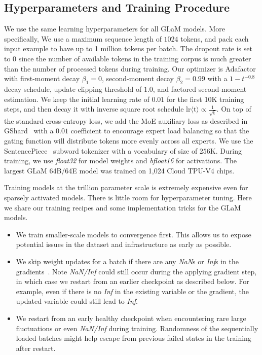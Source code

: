 \subsection{Hyperparameters and Training Procedure} We use the same learning hyperparameters for all GLaM models. More specifically, We use a maximum sequence length of $1024$ tokens, and pack each input example to have up to 1 million tokens per batch. The dropout rate is set to $0$ since the number of available tokens in the training corpus is much greater than the number of processed tokens during training. Our optimizer is Adafactor~\cite{Shazeer2018AdafactorAL} with first-moment decay $\beta_1=0$, second-moment decay $\beta_2=0.99$ with a $1 - t^{-0.8}$ decay schedule, update clipping threshold of $1.0$, and factored second-moment estimation. We keep the initial learning rate of $0.01$ for the first 10K training steps, and then decay it with inverse square root schedule $\text{lr} \langle \text{t} \rangle \propto \frac{1}{\sqrt{\text{t}}}$. On top of the standard cross-entropy loss, we add the MoE auxiliary loss as described in GShard~\cite{lepikhin2020gshard} with a $0.01$ coefficient to encourage expert load balancing so that the gating function will distribute tokens more evenly across all experts.  We use the SentencePiece~\cite{Kudo2018SentencePieceAS} subword tokenizer with a vocabulary of size of $256$K. During training, we use \textit{float32} for model weights and \textit{bfloat16} for activations. The largest GLaM 64B/64E model was trained on 1,024 Cloud TPU-V4 chips. 

Training models at the trillion parameter scale is extremely expensive even for sparsely activated models. There is little room for hyperparameter tuning. Here we share our training recipes and some implementation tricks for the GLaM models.

\begin{itemize}
    \item We train smaller-scale models to convergence first. This allows us to expose potential issues in the dataset and infrastructure as early as possible.
    \item We skip weight updates for a batch if there are any \textit{NaN}s or \textit{Inf}s in the gradients~\cite{shen2019lingvo}. Note \textit{NaN/Inf} could still occur during the applying gradient step, in which case we restart from an earlier checkpoint as described below. For example, even if there is no \textit{Inf} in the existing variable or the gradient, the updated variable could still lead to \textit{Inf}.

    \item We restart from an early healthy checkpoint when encountering rare large fluctuations or even \textit{NaN/Inf} during training. Randomness of the sequentially loaded batches might help escape from previous failed states in the training after restart.
\end{itemize}

